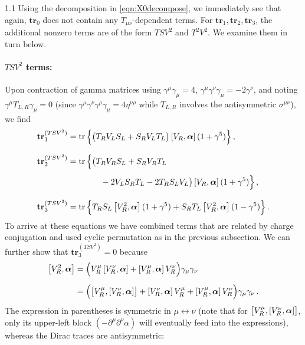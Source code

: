 \documentclass[a4paper,12pt]{article}
\def\mat#1{\boldsymbol{#1}}
\def\alphamat{\mat{\alpha}}
\def\btr{\mathbf{tr}}
\begin{document}
\begin{spacing}{1.1}
Using the decomposition in \cref{eqn:X0decompose}, we immediately see that again, $\btr_0$ does not contain any $T_{\mu\nu}$-dependent terms. For $\btr_1, \btr_2, \btr_3$, the additional nonzero terms are of the form $TSV^2$ and $T^2V^2$. We examine them in turn below.

\paragraph{$TSV^2$ terms:}
Upon contraction of gamma matrices using $\gamma^\mu\gamma_\mu = 4$, $\gamma^\mu \gamma^\nu \gamma_\mu = -2\gamma^\nu$, and noting $\gamma^\mu T_{L,R} \gamma_\mu = 0$ (since $\gamma^\mu \gamma^\nu\gamma^\rho\gamma_\mu = 4\eta^{\nu\rho}$ while $T_{L,R}$ involves the antisymmetric $\sigma^{\mu\nu}$), we find
\begin{subequations}
\begin{align}
\btr_1^{(TSV^2)} &= \tr \Big\{ \big( T_R V_L S_L + S_R V_L T_L \big)\,
\comm{V_R}{\alphamat}\, (1+\gamma^5) \Big\} \,, \\[8pt]
\btr_2^{(TSV^2)} &= \tr \Big\{ \big( T_R V_R S_L + S_R V_R T_L 
\notag\\[3pt]
&\hspace{40pt}
- 2 V_L S_R T_L  - 2 T_R S_L V_L \big)\,
\comm{V_R}{\alphamat}\, (1+\gamma^5) \Big\} \,, \\[8pt]
\btr_3^{(TSV^2)} &= \tr \Big\{ T_R S_L\, \comm{V_R^2}{\alphamat}\, (1+\gamma^5)
+ S_R T_L\, \comm{V_R^2}{\alphamat}\, (1-\gamma^5) \Big\} \,.
\end{align}
\end{subequations}
To arrive at these equations we have combined terms that are related by charge conjugation and used cyclic permutation as in the previous subsection. We can further show that $\btr_3^{(TSV^2)}=0$ because
\begin{align}
\comm{V_R^2}{\alphamat} &= \Big( V_R^\mu\, \comm{V_R^\nu}{\alphamat} + \comm{V_R^\mu}{\alphamat}\, V_R^\nu \Big) \gamma_\mu \gamma_\nu
\notag\\[5pt]
&= \Big( \big[ V_R^\mu, \comm{V_R^\nu}{\alphamat} \big] + \comm{V_R^\nu}{\alphamat}\, V_R^\mu + \comm{V_R^\mu}{\alphamat}\, V_R^\nu \Big) \gamma_\mu \gamma_\nu \,.
\end{align}
The expression in parentheses is symmetric in $\mu \leftrightarrow \nu$ (note that for $\big[ V_R^\mu, \comm{V_R^\nu}{\alphamat}\big]$, only its upper-left block $(-\partial^\mu\partial^\nu\alpha)$ will eventually feed into the expressions), whereas the Dirac traces are antisymmetric:

\end{spacing}
\end{document}
